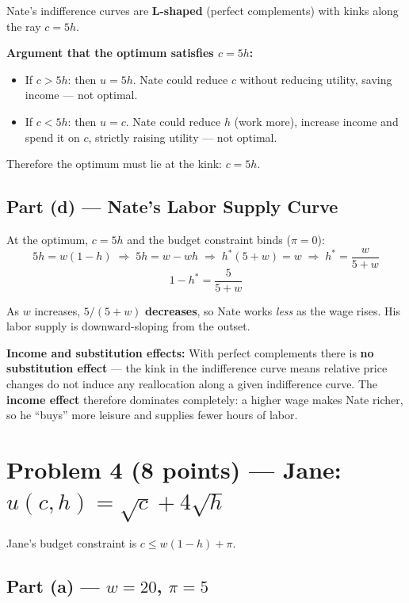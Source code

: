 \documentclass[12pt]{article}
\begin{document}
Nate's indifference curves are \textbf{L-shaped} (perfect complements) with
kinks along the ray $c = 5h$.

\textbf{Argument that the optimum satisfies $c = 5h$:}
\begin{itemize}[leftmargin=*]
    \item If $c > 5h$: then $u = 5h$. Nate could reduce $c$ without
    reducing utility, saving income --- not optimal.
    \item If $c < 5h$: then $u = c$. Nate could reduce $h$ (work more),
    increase income and spend it on $c$, strictly raising utility ---
    not optimal.
\end{itemize}
Therefore the optimum must lie at the kink: $c = 5h$.

\subsection*{Part (d) --- Nate's Labor Supply Curve}

At the optimum, $c = 5h$ and the budget constraint binds ($\pi = 0$):
\[
    5h = w(1-h)
    \;\Longrightarrow\;
    5h = w - wh
    \;\Longrightarrow\;
    h^*(5 + w) = w
    \;\Longrightarrow\;
    h^* = \frac{w}{5+w}
\]
\[
    \boxed{1 - h^* = \frac{5}{5+w}}
\]

As $w$ increases, $5/(5+w)$ \textbf{decreases}, so Nate works \emph{less}
as the wage rises. His labor supply is downward-sloping from the outset.

\textbf{Income and substitution effects:} With perfect complements there is
\textbf{no substitution effect} --- the kink in the indifference curve means
relative price changes do not induce any reallocation along a given
indifference curve. The \textbf{income effect} therefore dominates completely:
a higher wage makes Nate richer, so he ``buys'' more leisure and supplies
fewer hours of labor.

\section*{Problem 4 (8 points) --- Jane: $u(c,h) = \sqrt{c} + 4\sqrt{h}$}

Jane's budget constraint is $c \leq w(1-h) + \pi$.

\subsection*{Part (a) --- $w = 20$, $\pi = 5$}
\end{document}
